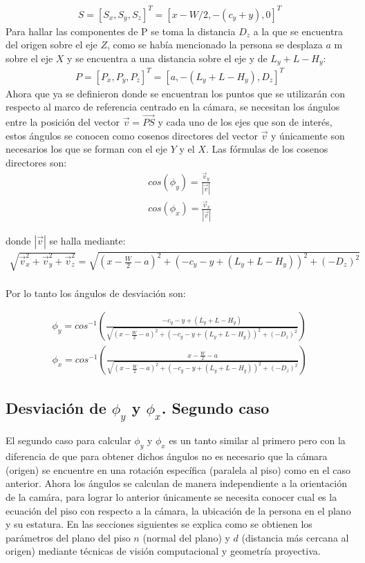     \begin{eqnarray}
    S= [S_x, S_y, S_z]^T= [x-W/2, -(c_y+y), 0]^T
    \end{eqnarray}
    Para hallar las componentes de P se toma la distancia $D_z$ a la que se encuentra del origen sobre el eje $Z$, como se había mencionado la persona se desplaza $a$ m sobre el eje $X$ y se encuentra a una distancia sobre el eje y de $L_y+L-H_y$:
    \begin{eqnarray}
    P=[P_x, P_y, P_z]^T= [a, -(L_y+L-H_y), D_z]^T
    \end{eqnarray}
  Ahora que ya se definieron donde se encuentran los puntos que se utilizarán con respecto al marco de referencia centrado en la cámara, se necesitan los ángulos entre la posición del vector $\vec v=\vec {PS}$ y cada uno de los ejes que son de interés, estos ángulos se conocen como cosenos directores del vector $\vec v$ y únicamente son necesarios los que se forman con el eje $Y$ y el $X$.
  Las fórmulas de los cosenos directores son:
  \begin{eqnarray}
  cos(\phi_y)=\frac{\vec v_y}{|\vec v|}\\
  cos(\phi_x)=\frac{\vec v_x}{|\vec v|}
  \end{eqnarray}
  
  donde $|\vec v|$ se halla mediante:
  \begin{eqnarray}
  \sqrt{\vec v_{x}^2+\vec v_{y}^2+\vec v_{z}^2}=\sqrt{(x-\frac{W}{2}-a)^2+(-c_y-y+(L_y+L-H_y))^2+(-D_z)^2}
  \end{eqnarray}
  \\Por lo tanto los ángulos de desviación son:
  
  \begin{eqnarray}
  \phi_y=cos^{-1} (\frac{-c_y-y+(L_y+L-H_y)}{\sqrt{(x-\frac{W}{2}-a)^2+(-c_y-y+(L_y+L-H_y))^2+(-D_z)^2}})\\
  \phi_x=cos^{-1}(\frac{x-\frac{W}{2}-a}{\sqrt{(x-\frac{W}{2}-a)^2+(-c_y-y+(L_y+L-H_y))^2+(-D_z)^2}})
  \end{eqnarray}   

      \subsection{Desviación de $\phi_y$ y $\phi_x$. Segundo caso}
      El segundo caso para calcular $\phi_y$ y $\phi_x$ es un tanto similar al primero pero con la diferencia de que para obtener dichos ángulos no es necesario que la cámara (origen) se encuentre en una rotación específica (paralela al piso) como en el caso anterior. Ahora los ángulos se calculan de manera independiente a la orientación de la camára, para lograr lo anterior únicamente se necesita conocer cual es la ecuación del piso con respecto a la cámara, la ubicación de la persona en el plano y su estatura. En las secciones siguientes se explica como se obtienen los parámetros del plano del piso $n$ (normal del plano) y $d$ (distancia más cercana al origen) mediante técnicas de visión computacional y geometría proyectiva.\\

